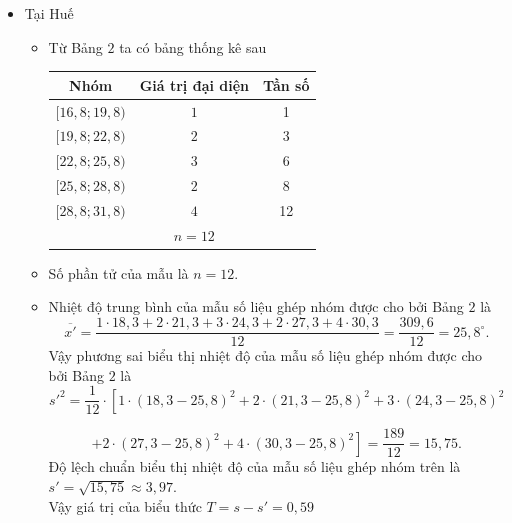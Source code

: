 \begin{ex}
{\begin{itemize}
\begin{itemize}
				\[\left.+1\cdot (27{,}3-24{,}8)^2+4\cdot (30{,}3-24{,}8)^2 \right]=\dfrac{249}{12}=20{,}75.
				\]
				Độ lệch chuẩn biểu thị nhiệt độ của mẫu số liệu ghép nhóm trên là $s=\sqrt{20{,}75} \approx 4{,}56$.
			\end{itemize}
			\item Tại Huế
			\begin{itemize}
				\item Từ Bảng $2$ ta có bảng thống kê sau
				\begin{center}
					\begin{tabular}{|c|c|c|}
						\hline
						Nhóm & Giá trị đại diện & Tần số \\
						\hline
						$[16{,}8; 19{,}8)$ & $1$ & 1 \\
						{$[19{,}8; 22{,}8)$} & $2$ & 3 \\
						{$[22{,}8; 25{,}8)$} & $3$ & 6 \\
						{$[25{,}8; 28{,}8)$} & $2$ & 8 \\
						{$[28{,}8; 31{,}8)$} & $4$ & 12 \\
						\hline
						& $n=12$& \\
						\hline
					\end{tabular}
				\end{center}
				\item Số phần tử của mẫu là $n=12$.
				\item Nhiệt độ trung bình của mẫu số liệu ghép nhóm được cho bởi Bảng $2$ là
				\[\overline{x'}=\dfrac{1\cdot 18{,}3+2\cdot 21{,}3+3\cdot 24{,}3+2\cdot 27{,}3+4\cdot 30{,}3}{12}=\dfrac{309{,}6}{12}=25{,}8^\circ.
				\]
				Vậy phương sai biểu thị nhiệt độ của mẫu số liệu ghép nhóm được cho bởi Bảng $2$ là
				\[s'^2=\dfrac{1}{12} \cdot \left[1\cdot (18{,}3-25{,}8)^2+2\cdot (21{,}3-25{,}8)^2+3\cdot (24{,}3-25{,}8)^2 \right.
				\]
				
				\[\left.+2\cdot (27{,}3-25{,}8)^2+4\cdot (30{,}3-25{,}8)^2 \right]=\dfrac{189}{12}=15{,}75.
				\]
				Độ lệch chuẩn biểu thị nhiệt độ của mẫu số liệu ghép nhóm trên là $s'=\sqrt{15{,}75} \approx 3{,}97$.\\
				Vậy giá trị của biểu thức $T=s-s'=0{,}59$
			\end{itemize}
		\end{itemize}
		
	}
\end{ex}

